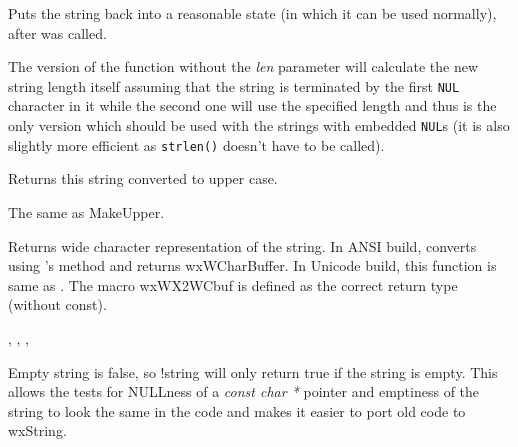 

Puts the string back into a reasonable state (in which it can be used
normally), after
\rtfsp{} was called.

The version of the function without the {\it len} parameter will calculate the
new string length itself assuming that the string is terminated by the first
{\tt NUL} character in it while the second one will use the specified length
and thus is the only version which should be used with the strings with
embedded {\tt NUL}s (it is also slightly more efficient as {\tt strlen()} 
doesn't have to be called).

\label{wxstringupper}


Returns this string converted to upper case.

\label{wxstringuppercase}


The same as MakeUpper.

\label{wxstringwcstr}



Returns wide character representation of the string.
In ANSI build, converts using 's 
method and returns wxWCharBuffer. In Unicode build, this function is same
as .
The macro wxWX2WCbuf is defined as the correct return type (without const).


,
, ,

\label{wxstringoperatornot}


Empty string is false, so !string will only return true if the string is empty.
This allows the tests for NULLness of a {\it const char *} pointer and emptiness
of the string to look the same in the code and makes it easier to port old code
to wxString.

